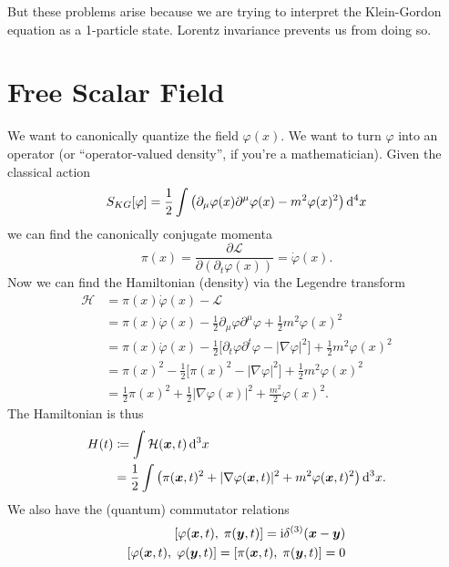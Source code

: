 But these problems arise because we are trying to interpret the
Klein-Gordon equation as a 1-particle state. Lorentz invariance prevents
us from doing so.

\section{Free Scalar Field} %

\M
We want to canonically quantize the field $\varphi(x)$. We want to turn
$\varphi$ into an operator (or ``operator-valued density'', if you're a
mathematician). Given the classical action
\begin{equation}
\action_{KG}[\varphi]=\frac{1}{2}\int\left(\partial_{\mu}\varphi(x)%
\partial^{\mu}\varphi(x)-m^{2}\varphi(x)^{2}\right)\D^{4}x
\end{equation}
we can find the canonically conjugate momenta
\begin{equation}
\pi(x)=\frac{\partial\mathcal{L}}{\partial(\partial_{t}\varphi(x))}=\dot{\varphi}(x).
\end{equation}
Now we can find the Hamiltonian (density) via the Legendre transform
\begin{subequations}
\begin{align}
\mathcal{H} 
&=\pi(x)\dot\varphi(x) - \mathcal{L}\\
&=\pi(x)\dot{\varphi}(x)
   -\frac{1}{2}\partial_{\mu}\varphi\partial^{\mu}\varphi
   +\frac{1}{2}m^{2}\varphi(x)^{2}\\
&=\pi(x)\dot{\varphi}(x)
  - \frac{1}{2}\bigl[\partial_{t}\varphi\partial^{t}\varphi-|\nabla\varphi|^{2}\bigr]
  + \frac{1}{2}m^{2}\varphi(x)^{2}\\
&=\pi(x)^{2}
  - \frac{1}{2}\bigl[\pi(x)^{2}-|\nabla\varphi|^{2}\bigr]
  + \frac{1}{2}m^{2}\varphi(x)^{2}\\
&=\frac{1}{2}\pi(x)^{2}
  +\frac{1}{2}|\nabla\varphi(x)|^{2}
  +\frac{m^{2}}{2}\varphi(x)^{2}.
\end{align}
\end{subequations}
The Hamiltonian is thus
\begin{equation}
\begin{split}
H(t) &\eqDef\int\mathcal{H}(\vec{x},t)\,\D^{3}x\\
&=\frac{1}{2}\int\left(\pi(\vec{x},t)^{2}+|\nabla\varphi(\vec{x},t)|^{2}+m^{2}\varphi(\vec{x},t)^{2}\right)\D^{3}x.
\end{split}
\end{equation}
We also have the (quantum) commutator relations
\begin{equation}
\begin{split}
\commutator{\varphi(\vec{x},t)}{\pi(\vec{y},t)}=\I\delta^{(3)}(\vec{x}-\vec{y})\\
\commutator{\varphi(\vec{x},t)}{\varphi(\vec{y},t)}=
\commutator{\pi(\vec{x},t)}{\pi(\vec{y},t)}=0
\end{split}
\end{equation}


